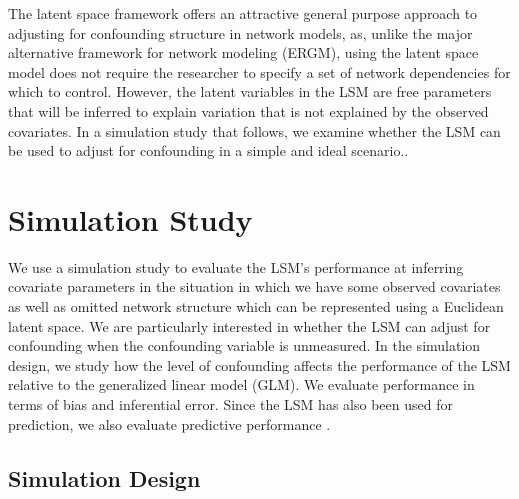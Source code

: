 \documentclass[11pt]{article}
\begin{document}
The latent space framework offers an attractive general purpose approach to adjusting for confounding structure in network models, as, unlike the major alternative framework for network modeling (ERGM), using the latent space model does not require the researcher to specify a set of network dependencies for which to control.  However, the latent variables in the LSM are free parameters that will be inferred to explain variation that is not explained by the observed covariates. In a simulation study that follows, we examine whether the LSM can be used to adjust for confounding in a simple and ideal scenario..

\section{Simulation Study}

We use a simulation study to evaluate the LSM's performance at
inferring covariate parameters in the situation in which we have some
observed covariates as well as omitted network structure which can be
represented using a Euclidean latent space. We are particularly
interested in whether the LSM can adjust for confounding when the
confounding variable is unmeasured. In the simulation design, we study
how the level of confounding affects the performance of the LSM
relative to the generalized linear model (GLM). We evaluate performance in terms of bias and
inferential error. Since the LSM has also been used for prediction,  we also evaluate predictive performance
\citep[e.g., ]{ward2013gravity, fletcher2011social, fletcher2013network,
  chiu2011unifying}.

\subsection{Simulation Design}
\end{document}
